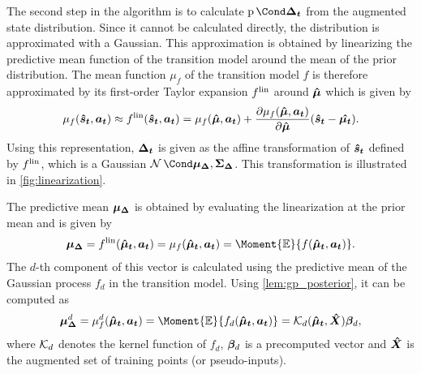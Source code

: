 The second step in the algorithm is to calculate $\Prob{\rv{\Delta_t}}$ from the augmented state distribution.
Since it cannot be calculated directly, the distribution is approximated with a Gaussian.
This approximation is obtained by linearizing the predictive mean function of the transition model around the mean of the prior distribution.
The mean function $\mu_f$ of the transition model $f$ is therefore approximated by its first-order Taylor expansion $f^{\text{lin}}$ around $\bm{\hat{\mu}}$ which is given by
\begin{align}
    \mu_f(\bm{\hat{s}_t}, \bm{a_t}) \approx f^{\text{lin}}(\bm{\hat{s}_t}, \bm{a_t}) = \mu_f(\bm{\hat{\mu}}, \bm{a_t}) + \frac{\partial \mu_f(\bm{\hat{\mu}}, \bm{a_t})}{\partial \bm{\hat{\mu}}} (\bm{\hat{s}_t} - \bm{\hat{\mu_t}}).
\end{align}
Using this representation, $\bm{\Delta_t}$ is given as the affine transformation of $\bm{\hat{s}_t}$ defined by $f^{\text{lin}}$, which is a Gaussian $\Gaussian{\mat{\mu_\Delta}, \mat{\Sigma_\Delta}}$.
This transformation is illustrated in \cref{fig:linearization}.

The predictive mean $\bm{\mu_\Delta}$ is obtained by evaluating the linearization at the prior mean and is given by
\begin{align}
    \rv{\mu_\Delta} = \lin{f}(\mat{\hat{\mu}_t}, \mat{a_t}) = \mu_f(\mat{\hat{\mu}_t}, \mat{a_t}) = \Moment{\E}{f(\rv{\hat{\mu}_t}, \mat{a_t})}.
\end{align}
The $d$-th component of this vector is calculated using the predictive mean of the Gaussian process $f_d$ in the transition model.
Using \cref{lem:gp_posterior}, it can be computed as
\begin{align}
    \rv{\mu_\Delta}^d = \mu_f^d(\rv{\hat{\mu}_t}, \mat{a_t}) = \Moment{\E}{f_d(\rv{\hat{\mu}_t}, \mat{a_t})} = \K_d( \rv{\hat{\mu}_t}, \mat{\hat{X}})\mat{\beta}_d,
\end{align}
where $\operatorname{\mathcal{K}}_d$ denotes the kernel function of $f_d$, $\bm{\beta}_d$ is a precomputed vector and $\bm{\hat{X}}$ is the augmented set of training points (or pseudo-inputs).

